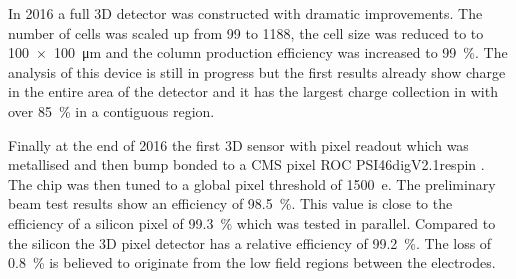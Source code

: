 In 2016 a full 3D detector was constructed with dramatic improvements. The number of cells was scaled up from 99 to 1188, the cell size was reduced to to \SI{100x100}{\micro\meter} and the column production efficiency was increased to \SI{99}{\%}. The analysis of this device is still in progress but the first results already show charge in the entire area of the detector and it has the largest charge collection in \pcvd with over \SI{85}{\%} in a contiguous region.\par
Finally at the end of 2016 the first \pcvd 3D sensor with pixel readout which was metallised and then bump bonded to a CMS pixel \ac{ROC} PSI46digV2.1respin \cite{kornmayer}. The chip was then tuned to a global pixel threshold of \SI{1500}{e}. The preliminary beam test results show an efficiency of \SI{98.5}{\%}. This value is close to the efficiency of a silicon pixel of \SI{99.3}{\%} which was tested in parallel. Compared to the silicon the 3D pixel detector has a relative efficiency of \SI{99.2}{\%}. The loss of \SI{0.8}{\%} is believed to originate from the low field regions between the electrodes.